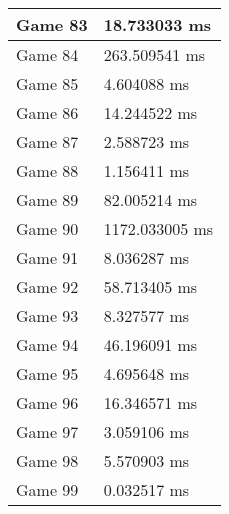 \begin{tabular}{|l|l|}
	Game 83 & 18.733033 ms \\ \hline
	Game 84 & 263.509541 ms \\ \hline
	Game 85 & 4.604088 ms \\ \hline
	Game 86 & 14.244522 ms \\ \hline
	Game 87 & 2.588723 ms \\ \hline
	Game 88 & 1.156411 ms \\ \hline
	Game 89 & 82.005214 ms \\ \hline
	Game 90 & 1172.033005 ms \\ \hline
	Game 91 & 8.036287 ms \\ \hline
	Game 92 & 58.713405 ms \\ \hline
	Game 93 & 8.327577 ms \\ \hline
	Game 94 & 46.196091 ms \\ \hline
	Game 95 & 4.695648 ms \\ \hline
	Game 96 & 16.346571 ms \\ \hline
	Game 97 & 3.059106 ms \\ \hline
	Game 98 & 5.570903 ms \\ \hline
	Game 99 & 0.032517 ms \\ \hline
\end{tabular}
